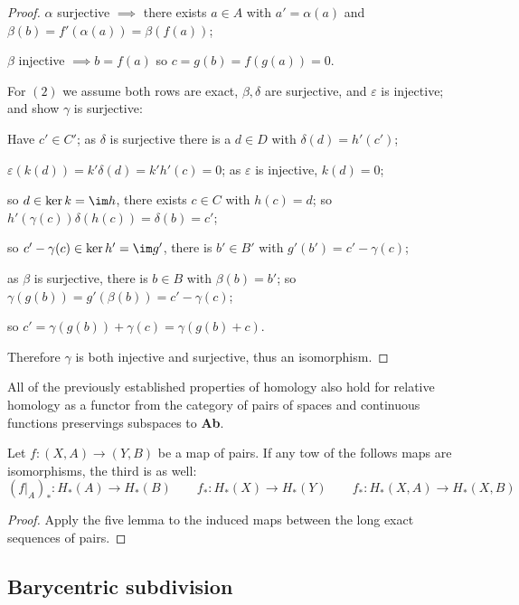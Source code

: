 \documentclass{article}
\begin{document}
\begin{lemma}
\begin{proof}
        $\alpha$ surjective $\implies$ there exists $a\in A$ with $a' = \alpha(a)$ and $\beta(b) = f'(\alpha(a)) = \beta(f(a))$;

        $\beta$ injective $\implies b=f(a)$ so $c=g(b) = f(g(a)) = 0$.

    \noindent For $(2)$ we assume both rows are exact, $\beta,\delta$ are surjective, and $\varepsilon$ is injective; and show $\gamma$ is surjective:
        
        Have $c'\in C'$; as $\delta$ is surjective there is a $d\in D$ with $\delta(d)=h'(c')$;
        
        $\varepsilon (k(d)) = k'\delta(d) = k'h'(c) = 0$; as $\varepsilon$ is injective, $k(d) = 0$;
        
        so $d\in\ker k = \im h$, there exists $c\in C$ with  $h(c) = d$; so $h'(\gamma(c))\delta(h(c)) = \delta(b) = c'$;
        
        so $c'-\gamma(c)\in\ker h' = \im g'$, there is $b'\in B'$ with $g'(b')=c'-\gamma(c)$;
        
        as $\beta$ is surjective, there is $b\in B$ with $\beta(b) = b'$; so $\gamma(g(b)) = g'(\beta(b)) = c'-\gamma(c)$;
        
        so $c'=\gamma(g(b))+\gamma(c) = \gamma(g(b) + c)$.

    \noindent Therefore $\gamma$ is both injective and surjective, thus an isomorphism.
    \end{proof}
\end{lemma}

All of the previously established properties of homology also hold for relative homology as a functor from the category of pairs of spaces and continuous functions preservings subspaces to \textbf{Ab}.

\begin{corollary}
    Let $f:(X,A)\rightarrow (Y,B)$ be a map of pairs. If any tow of the follows maps are isomorphisms, the third is as well: \[
    (f\vert_A)_* : H_*(A)\rightarrow H_*(B) \qquad f_*:H_*(X)\rightarrow H_*(Y) \qquad f_*: H_*(X,A) \rightarrow H_*(X,B)
    \]\begin{proof}
        Apply the five lemma to the induced maps between the long exact sequences of pairs.
    \end{proof}
\end{corollary}

\subsection{Barycentric subdivision}
\end{document}
